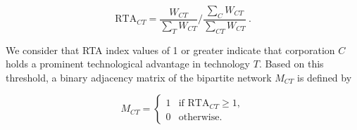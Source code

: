 \begin{center} \label{eq1}
    \begin{equation}
    \mbox{RTA}_{CT} = \frac{W_{CT}}{\sum_{T} W_{CT}} \Bigg/ \frac{\sum_{C} W_{CT}}{\sum_{CT} W_{CT}}~.
    \end{equation}
\end{center}
We consider that RTA index values of 1 or greater indicate that corporation \(C\) holds a prominent technological advantage in technology \(T\). Based on this threshold, a binary adjacency matrix of the bipartite network \(M_{CT}\) is defined by

\begin{center}
\begin{equation} \label{eq2}
M_{CT} = 
\begin{cases} 
1 & \text{if } \mbox{RTA}_{CT} \geq 1, \\
0 & \text{otherwise}.
\end{cases}
\end{equation}
\end{center}
